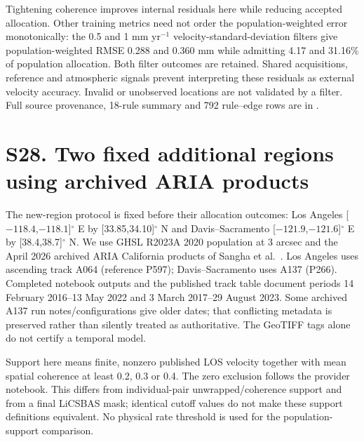 Tightening coherence improves internal residuals here while reducing accepted allocation. Other training metrics need not order the population-weighted error monotonically: the 0.5 and 1 mm yr$^{-1}$ velocity-standard-deviation filters give population-weighted RMSE 0.288 and 0.360 mm while admitting 4.17 and 31.16\% of population allocation. Both filter outcomes are retained. Shared acquisitions, reference and atmospheric signals prevent interpreting these residuals as external velocity accuracy. Invalid or unobserved locations are not validated by a filter. Full source provenance, 18-rule summary and 792 rule--edge rows are in .
\clearpage
\section*{S28. Two fixed additional regions using archived ARIA products}
The new-region protocol is fixed before their allocation outcomes: Los Angeles [$-118.4$,$-118.1$]$^\circ$ E by [33.85,34.10]$^\circ$ N and Davis--Sacramento [$-121.9$,$-121.6$]$^\circ$ E by [38.4,38.7]$^\circ$ N. We use GHSL R2023A 2020 population at 3 arcsec and the April 2026 archived ARIA California products of Sangha et al.\ \citep{sangha2026california,sangha2026data}. Los Angeles uses ascending track A064 (reference P597); Davis--Sacramento uses A137 (P266). Completed notebook outputs and the published track table document periods 14 February 2016--13 May 2022 and 3 March 2017--29 August 2023. Some archived A137 run notes/configurations give older dates; that conflicting metadata is preserved rather than silently treated as authoritative. The GeoTIFF tags alone do not certify a temporal model.

Support here means finite, nonzero published LOS velocity together with mean spatial coherence at least 0.2, 0.3 or 0.4. The zero exclusion follows the provider notebook. This differs from individual-pair unwrapped/coherence support and from a final LiCSBAS mask; identical cutoff values do not make these support definitions equivalent. No physical rate threshold is used for the population-support comparison.

